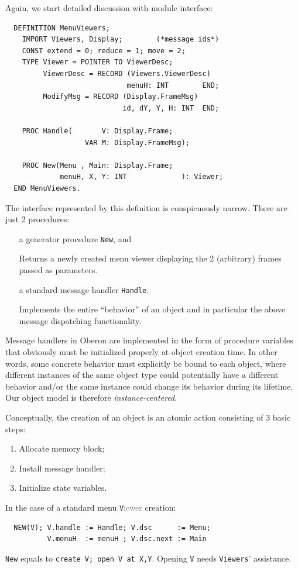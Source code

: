Again, we start detailed discussion with module interface:
\begin{verbatim}
  DEFINITION MenuViewers;
    IMPORT Viewers, Display;        (*message ids*)
    CONST extend = 0; reduce = 1; move = 2;
    TYPE Viewer = POINTER TO ViewerDesc;
         ViewerDesc = RECORD (Viewers.ViewerDesc)
                             menuH: INT        END;
         ModifyMsg = RECORD (Display.FrameMsg)
                            id, dY, Y, H: INT  END;
  
    PROC Handle(       V: Display.Frame;
                   VAR M: Display.FrameMsg);

    PROC New(Menu , Main: Display.Frame;
             menuH, X, Y: INT             ): Viewer;
  END MenuViewers.
\end{verbatim}
The interface represented by this definition is conspicuously narrow.
There are just 2 procedures:
\begin{itemize}
  \item[a] generator procedure \verb|New|, and

    Returns a newly created menu viewer displaying the 2 (arbitrary) frames passed as parameters.

  \item[a] standard message handler \verb|Handle|.

    Implements the entire “behavior” of an object and in particular
    the above message dispatching functionality.
\end{itemize}

Message handlers in Oberon are implemented in the form of procedure variables that obviously
must be initialized properly at object creation time.  In other words, some concrete behavior
must explicitly be bound to each object, where different instances of the same object type
could potentially have a different behavior and/or the same instance could change its behavior
during its lifetime.  Our object model is therefore \emph{instance-centered}.

Conceptually, the creation of an object is an atomic action consisting of 3 basic steps:
\begin{enumerate}
  \item Allocate memory block;
  \item Install message handler;
  \item Initialize state variables.
\end{enumerate}
In the case of a standard menu \verb|V|\textcolor{gray}{iewer} creation:
\begin{verbatim}
  NEW(V); V.handle := Handle; V.dsc      := Menu;
          V.menuH  := menuH ; V.dsc.next := Main
\end{verbatim}
\verb|New| equals to \verb|create V; open V at X,Y|.
Opening \verb|V| needs \verb|Viewers|' assistance.

